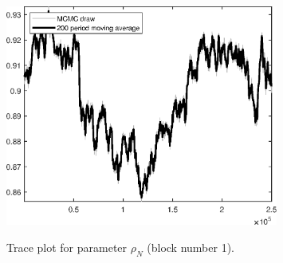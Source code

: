 \begin{figure}[H]
\centering
  \includegraphics[width=0.8\textwidth]{BRS_imp_mobility_alt/graphs/TracePlot_rho_N_blck_1}\\
    \caption{Trace plot for parameter ${\rho_N}$ (block number 1).}
\end{figure}
